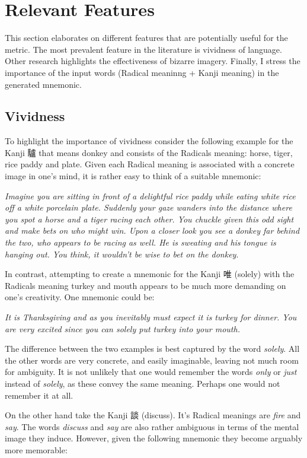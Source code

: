 \section{Relevant Features} \label{sec:body_relevant_features}
This section elaborates on different features that are potentially useful for the metric. The most prevalent feature in the literature is vividness of language. Other research highlights the effectiveness of bizarre imagery. Finally, I stress the importance of the input words (Radical meaninng + Kanji meaning) in the generated mnemonic.

\subsection{Vividness}
To highlight the importance of vividness consider the following example for the Kanji 驢 that means donkey and consists of the Radicals meaning: horse, tiger, rice paddy and plate. Given each Radical meaning is associated with a concrete image in one's mind, it is rather easy to think of a suitable mnemonic:

\emph{Imagine you are sitting in front of a delightful rice paddy while eating white rice off a white porcelain plate. Suddenly your gaze wanders into the distance where you spot a horse and a tiger racing each other. You chuckle given this odd sight and make bets on who might win. Upon a closer look you see a donkey far behind the two, who appears to be racing as well. He is sweating and his tongue is hanging out. You think, it wouldn't be wise to bet on the donkey}.

In contrast, attempting to create a mnemonic for the Kanji 唯 (solely) with the Radicals meaning turkey and mouth appears to be much more demanding on one's creativity. One mnemonic could be:

\emph{It is Thanksgiving and as you inevitably must expect it is turkey for dinner. You are very excited since you can solely put turkey into your mouth.}

The difference between the two examples is best captured by the word \emph{solely}. All the other words are very concrete, and easily imaginable, leaving not much room for ambiguity. It is not unlikely that one would remember the words \emph{only} or \emph{just} instead of \emph{solely}, as these convey the same meaning. Perhaps one would not remember it at all.

On the other hand take the Kanji 談 (discuss). It's Radical meanings are \emph{fire} and \emph{say}. The words \emph{discuss} and \emph{say} are also rather ambiguous in terms of the mental image they induce. However, given the following mnemonic they become arguably more memorable: 

